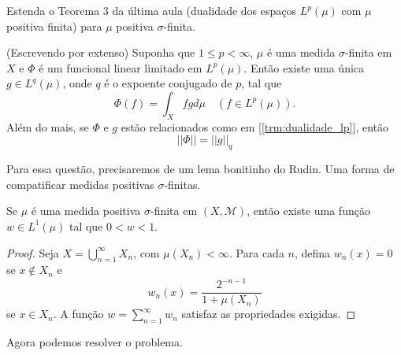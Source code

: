 \begin{problem}
    \label{prob:l6:3}
    Estenda o Teorema 3 da última aula (dualidade dos espaços $L^p(\mu)$ com $\mu$ positiva finita) para $\mu$ positiva $\sigma$-finita.

    (Escrevendo por extenso) Suponha que $1 \leq p < \infty$, $\mu$ é uma medida $\sigma$-finita em $X$ e $\Phi$ é um funcional linear limitado em $L^p(\mu)$. Então
    existe uma única $g \in L^q(\mu)$, onde $q$ é o expoente conjugado de $p$, tal que 
    \begin{equation}
        \label{trm:dualidade_lp}
        \Phi(f) = \int_X fg d\mu\quad (f \in L^p(\mu)).
    \end{equation}
    Além do mais, se $\Phi$ e $g$ estão relacionados como em [\ref{trm:dualidade_lp}], então
    \begin{equation}
        ||\Phi|| = ||g||_q
    \end{equation}
\end{problem}
Para essa questão, precisaremos de um lema bonitinho do Rudin. Uma forma de compatificar medidas positivas $\sigma$-finitas.
\begin{lemma}
    \label{lemm:compactificacao_de_sigma_finita}
    Se $\mu$ é uma medida positiva $\sigma$-finita em $(X, \mathcal{M})$, então existe uma função $w \in L^1(\mu)$ tal que
    $0 < w < 1$. 
\end{lemma}
\begin{proof}
    Seja $X = \bigcup_{n=1}^{\infty} X_n$, com $\mu(X_n) < \infty$. Para cada $n$, defina $w_n(x) = 0$ se $x \not \in X_n$ e 
    $$w_n(x) = \frac{2^{-n - 1}}{1 + \mu(X_n)}$$
    se $x \in X_n$. A função $w = \sum_{n=1}^{\infty} w_n$ satisfaz as propriedades exigidas.
\end{proof}
Agora podemos resolver o problema.
